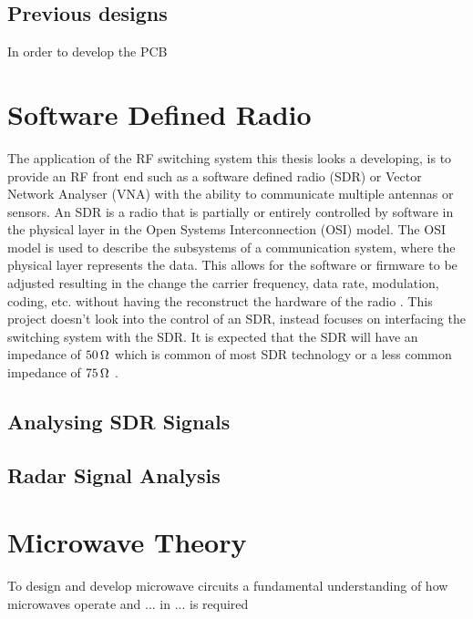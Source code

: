 \documentclass[12pt,openany,a4paper]{book}
\newcommand{\ohm}	{\ensuremath{\rm\,\Omega}}
\begin{document}
\subsection{Previous designs}
In order to develop the PCB 




\section{Software Defined Radio}
The application of the RF switching system this thesis looks a developing, is to provide an RF front end such as a software defined radio (SDR) or Vector Network Analyser (VNA) with the ability to communicate multiple antennas or sensors. An SDR is a radio that is partially or entirely controlled by software in the physical layer in the Open Systems Interconnection (OSI) model. The OSI model is used to describe the subsystems of a communication system, where the physical layer represents the data. This allows for the software or firmware to be adjusted resulting in the change the carrier frequency, data rate, modulation, coding, etc. without having the reconstruct the hardware of the radio \cite{ref6}. This project doesn't look into the control of an SDR, instead focuses on interfacing the switching system with the SDR. It is expected that the SDR will have an impedance of $50\ohm$ which is common of most SDR technology or a less common impedance of $75\ohm$ \cite{ref7}.

\subsection{Analysing SDR Signals}

\subsection{Radar Signal Analysis}



\section{Microwave Theory}
To design and develop microwave circuits a fundamental understanding of how microwaves operate and ... in ... is required
\end{document}
